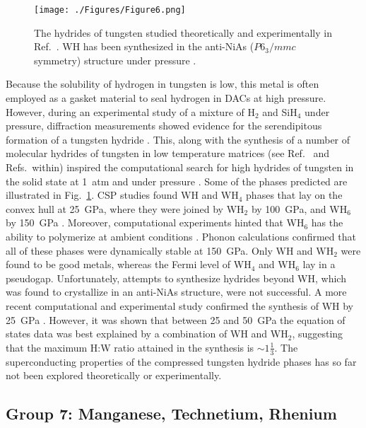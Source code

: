 \documentclass[12pt,letterpaper,oneside]{article}
\begin{document}
%
\begin{figure}[h!]
\begin{center}
\texttt{[image: ./Figures/Figure6.png]}
\end{center}
\caption{The hydrides of tungsten studied theoretically and experimentally in Ref.\ \cite{Zaleski:2012a}. WH has been synthesized in the anti-NiAs ($P6_3/mmc$ symmetry) structure under pressure \cite{Zaleski:2012a, Scheler:2013b}.}
\label{fig:tungsten}
\end{figure}
%
Because the solubility of hydrogen in tungsten is low, this metal is often employed as a gasket material to seal hydrogen in DACs at high pressure. However, during an experimental study of a mixture of H$_2$ and SiH$_4$ under pressure, diffraction measurements showed evidence for the serendipitous formation of a tungsten hydride \cite{Strobel:2009a}. This, along with the synthesis of a number of molecular hydrides of tungsten in low temperature matrices (see Ref.\ \cite{Wang:2008a} and Refs.\ within) inspired the computational search for high hydrides of tungsten in the solid state at 1~atm and under pressure \cite{Labet:2012e,Zaleski:2012a}. Some of the phases predicted are illustrated in Fig.\ \ref{fig:tungsten}. CSP studies found WH and WH$_4$ phases that lay on the convex hull at 25~GPa, where they were joined by WH$_2$ by 100~GPa, and WH$_6$ by 150~GPa \cite{Zaleski:2012a}. Moreover, computational experiments hinted that WH$_6$ has the ability to polymerize at ambient conditions \cite{Labet:2012e}. Phonon calculations confirmed that all of these phases were dynamically stable at 150~GPa. Only WH and WH$_2$ were found to be good metals, whereas the Fermi level of WH$_4$ and WH$_6$ lay in a pseudogap. Unfortunately, attempts to synthesize hydrides beyond WH, which was found to crystallize in an anti-NiAs structure, were not successful. 
A more recent computational and experimental study confirmed the synthesis of WH by 25~GPa \cite{Scheler:2013b}. However, it was shown that between 25 and 50~GPa the equation of states data was best explained by a combination of WH and WH$_2$, suggesting that the maximum H:W ratio attained in the synthesis is $\sim 1\frac{1}{3}$. The superconducting properties of the compressed tungsten hydride phases has so far not been explored theoretically or experimentally.


\subsection{Group 7: Manganese, Technetium, Rhenium} 
\end{document}
